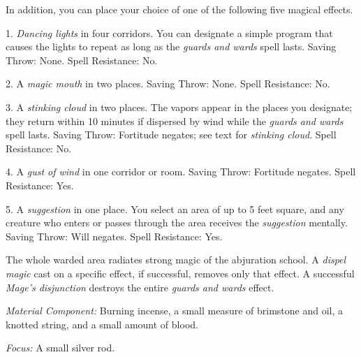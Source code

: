 In addition, you can place your choice of one of the following five magical effects.

1. \textit{Dancing lights} in four corridors. You can designate a simple program 
that causes the lights to repeat as long as the \textit{guards and wards} spell 
lasts. Saving Throw: None. Spell Resistance: No.

2. A \textit{magic mouth} in two places. Saving Throw: None. Spell Resistance: 
No.

3. A \textit{stinking cloud} in two places. The vapors appear in the places you 
designate; they return within 10 minutes if dispersed by wind while the \textit{guards 
and wards} spell lasts. Saving Throw: Fortitude negates; see text for \textit{stinking 
cloud}. Spell Resistance: No.

4. A \textit{gust of wind} in one corridor or room. Saving Throw: Fortitude negates. 
Spell Resistance: Yes.

5. A \textit{suggestion} in one place. You select an area of up to 5 feet square, 
and any creature who enters or passes through the area receives the \textit{suggestion 
}mentally. Saving Throw: Will negates. Spell Resistance: Yes.

The whole warded area radiates strong magic of the abjuration school. A \textit{dispel 
magic} cast on a specific effect, if successful, removes only that effect. A successful 
\textit{Mage's disjunction} destroys the entire \textit{guards and wards} effect.

\textit{Material Component:} Burning incense, a small measure of brimstone and 
oil, a knotted string, and a small amount of blood.

\textit{Focus:} A small silver rod.


